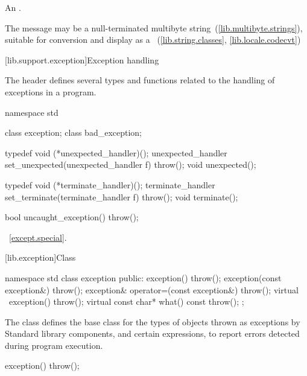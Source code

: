 \begin{itemdescr}
\pnum
\returns
An  \ntbs.%

\pnum
\notes
The message may be a null-terminated multibyte string~(\ref{lib.multibyte.strings}),
suitable for conversion and display as a
~(\ref{lib.string.classes}, \ref{lib.locale.codecvt})
\end{itemdescr}

[lib.support.exception]{Exception handling}

\pnum
The header
defines several types and functions related to the handling of exceptions in a \Cpp program.


%
%
\begin{codeblock}
namespace std {
  class exception;
  class bad_exception;

  typedef void (*unexpected_handler)();
  unexpected_handler set_unexpected(unexpected_handler f) throw();
  void unexpected();

  typedef void (*terminate_handler)();
  terminate_handler set_terminate(terminate_handler f) throw();
  void terminate();

  bool uncaught_exception() throw();
}
\end{codeblock}

\xref~\ref{except.special}.

[lib.exception]{Class }

%
\begin{codeblock}
namespace std {
  class exception {
  public:
    exception() throw();
    exception(const exception&) throw();
    exception& operator=(const exception&) throw();
    virtual ~exception() throw();
    virtual const char* what() const throw();
  };
}
\end{codeblock}

\pnum
The class
defines the base
class for the types of objects thrown as exceptions by
\Cpp Standard library components, and certain
expressions, to report errors detected during program execution.

%
\begin{itemdecl}
exception() throw();
\end{itemdecl}


